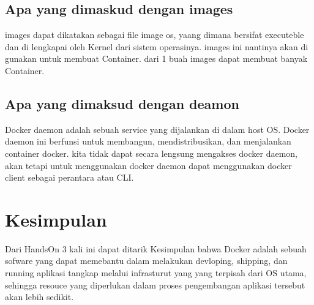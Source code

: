\documentclass[11pt,a4paper]{article}
\begin{document}
\subsection{Apa yang dimaskud dengan images}
images dapat dikatakan sebagai file image os, yaang dimana bersifat executeble dan di lengkapai 
oleh Kernel dari sistem operasinya. images ini nantinya akan di gunakan untuk membuat Container.
dari 1 buah images dapat membuat banyak Container. \cite{pratama_2019}

\subsection{Apa yang dimaksud dengan deamon}
Docker daemon adalah sebuah service yang dijalankan di dalam host OS. Docker daemon ini
berfunsi untuk membangun, mendistribusikan, dan menjalankan container docker.
kita tidak dapat secara lengsung mengakses docker daemon, akan tetapi untuk menggunakan docker
daemon dapat menggunakan docker client sebagai perantara atau CLI. \cite{pratama_2019}


\section{Kesimpulan}
Dari HandsOn 3 kali ini dapat ditarik Kesimpulan bahwa Docker adalah sebuah sofware yang 
dapat memebantu dalam melakukan devloping, shipping, dan running aplikasi tangkap melalui
infrasturut yang yang terpisah dari OS utama, sehingga resouce yang diperlukan 
dalam proses pengembangan aplikasi tersebut akan lebih sedikit.

\newpage


\end{document}
